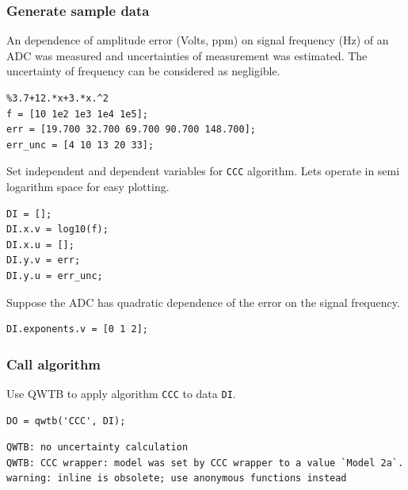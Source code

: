 \startcontents[localtoc]



{}
\subsubsection*{Generate sample data}



An dependence of amplitude error (Volts, ppm) on signal frequency (Hz) of an ADC was measured and
uncertainties of measurement was estimated. The uncertainty of frequency can be considered as
negligible.

\begin{lstlisting}
%3.7+12.*x+3.*x.^2
f = [10 1e2 1e3 1e4 1e5];
err = [19.700 32.700 69.700 90.700 148.700];
err_unc = [4 10 13 20 33];
\end{lstlisting}


Set independent and dependent variables for \texttt{CCC} algorithm. Lets operate in semi logarithm space
for easy plotting.

\begin{lstlisting}
DI = [];
DI.x.v = log10(f);
DI.x.u = [];
DI.y.v = err;
DI.y.u = err_unc;
\end{lstlisting}


Suppose the ADC has quadratic dependence of the error on the signal frequency.

\begin{lstlisting}
DI.exponents.v = [0 1 2];
\end{lstlisting}


{}
\subsubsection*{Call algorithm}



Use QWTB to apply algorithm \texttt{CCC} to data \texttt{DI}.

\begin{lstlisting}
DO = qwtb('CCC', DI);
\end{lstlisting}
\begin{lstlisting}[language={},xleftmargin=5pt,frame=none]
QWTB: no uncertainty calculation
QWTB: CCC wrapper: model was set by CCC wrapper to a value `Model 2a`.
warning: inline is obsolete; use anonymous functions instead

\end{lstlisting}


